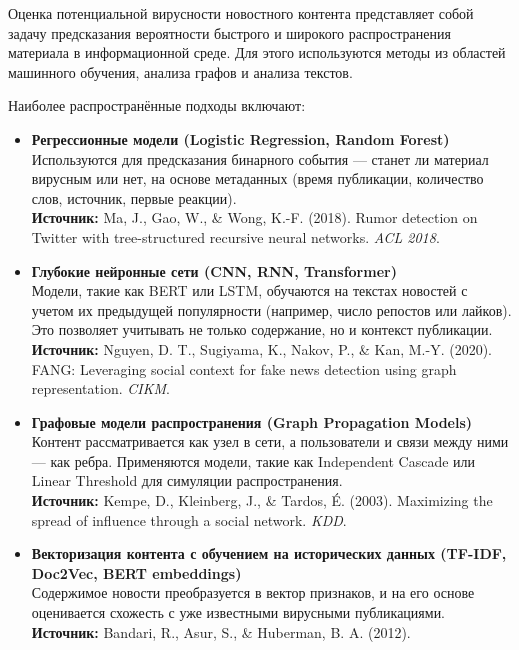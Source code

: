 Оценка потенциальной вирусности новостного контента представляет собой
задачу предсказания вероятности быстрого и широкого распространения
материала в информационной среде. Для этого используются методы из
областей машинного обучения, анализа графов и анализа текстов.

Наиболее распространённые подходы включают:

\begin{itemize}
\item
  \textbf{Регрессионные модели (Logistic Regression, Random Forest)}\\
  Используются для предсказания бинарного события --- станет ли материал
  вирусным или нет, на основе метаданных (время публикации, количество
  слов, источник, первые реакции).\\
  \textbf{Источник:} Ma, J., Gao, W., \& Wong, K.-F. (2018). Rumor
  detection on Twitter with tree-structured recursive neural networks.
  \emph{ACL 2018}.\\
\item
  \textbf{Глубокие нейронные сети (CNN, RNN, Transformer)}\\
  Модели, такие как BERT или LSTM, обучаются на текстах новостей с
  учетом их предыдущей популярности (например, число репостов или
  лайков). Это позволяет учитывать не только содержание, но и контекст
  публикации.\\
  \textbf{Источник:} Nguyen, D. T., Sugiyama, K., Nakov, P., \& Kan,
  M.-Y. (2020). FANG: Leveraging social context for fake news detection
  using graph representation. \emph{CIKM}.\\
\item
  \textbf{Графовые модели распространения (Graph Propagation Models)}\\
  Контент рассматривается как узел в сети, а пользователи и связи между
  ними --- как ребра. Применяются модели, такие как Independent Cascade
  или Linear Threshold для симуляции распространения.\\
  \textbf{Источник:} Kempe, D., Kleinberg, J., \& Tardos, É. (2003).
  Maximizing the spread of influence through a social network.
  \emph{KDD}.
\item
  \textbf{Векторизация контента с обучением на исторических данных
  (TF-IDF, Doc2Vec, BERT embeddings)}\\
  Содержимое новости преобразуется в вектор признаков, и на его основе
  оценивается схожесть с уже известными вирусными публикациями.\\
  \textbf{Источник:} Bandari, R., Asur, S., \& Huberman, B. A. (2012).

\end{itemize}
